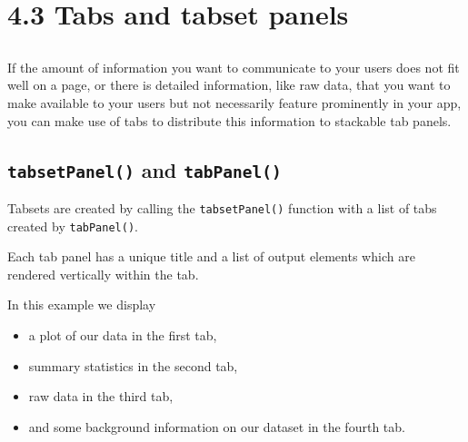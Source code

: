 \documentclass[
  letterpaper,
  DIV=11,
  numbers=noendperiod]{scrreprt}
\providecommand{\tightlist}{%
  \setlength{\itemsep}{0pt}\setlength{\parskip}{0pt}}
\begin{document}
\hypertarget{tabs-and-tabset-panels}{%
\section{4.3 Tabs and tabset panels}\label{tabs-and-tabset-panels}}

\hypertarget{section-62}{%
\subsection{}\label{section-62}}

If the amount of information you want to communicate to your users does
not fit well on a page, or there is detailed information, like raw data,
that you want to make available to your users but not necessarily
feature prominently in your app, you can make use of tabs to distribute
this information to stackable tab panels.

\hypertarget{tabsetpanel-and-tabpanel}{%
\subsection{\texorpdfstring{\texttt{tabsetPanel()} and
\texttt{tabPanel()}}{tabsetPanel() and tabPanel()}}\label{tabsetpanel-and-tabpanel}}

Tabsets are created by calling the \texttt{tabsetPanel()} function with
a list of tabs created by \texttt{tabPanel()}.

Each tab panel has a unique title and a list of output elements which
are rendered vertically within the tab.

In this example we display

\begin{itemize}
\tightlist
\item
  a plot of our data in the first tab,
\item
  summary statistics in the second tab,
\item
  raw data in the third tab,
\item
  and some background information on our dataset in the fourth tab.
\end{itemize}
\end{document}
